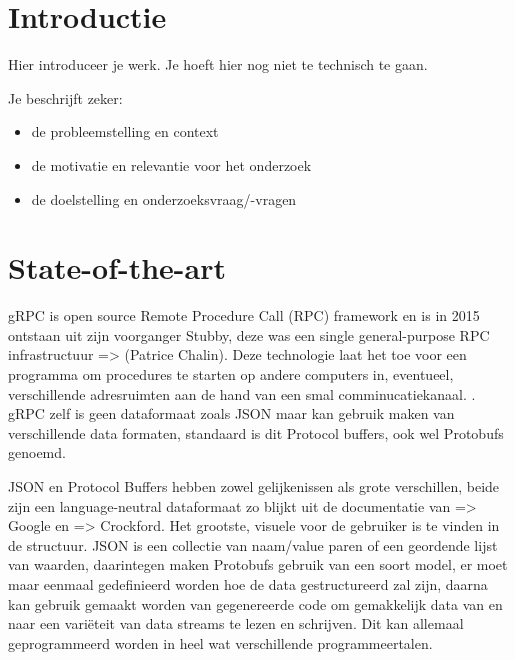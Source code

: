 
\section{Introductie} %
\label{sec:introductie}

Hier introduceer je werk. Je hoeft hier nog niet te technisch te gaan.

Je beschrijft zeker:

\begin{itemize}
  \item de probleemstelling en context
  \item de motivatie en relevantie voor het onderzoek
  \item de doelstelling en onderzoeksvraag/-vragen
\end{itemize}


\section{State-of-the-art}
\label{sec:state-of-the-art}
gRPC is open source Remote Procedure Call (RPC) framework en is in 2015 ontstaan uit zijn voorganger Stubby, deze was een single general-purpose RPC infrastructuur \autocite{Chalin} => (Patrice Chalin). Deze technologie laat het toe voor een programma om procedures te starten op andere computers in, eventueel, verschillende adresruimten aan de hand van een smal comminucatiekanaal. \autocite{Nelson1981}. gRPC zelf is geen dataformaat zoals JSON maar kan gebruik maken van verschillende data formaten, standaard is dit Protocol buffers, ook wel Protobufs genoemd.

JSON en Protocol Buffers hebben zowel gelijkenissen als grote verschillen, beide zijn een language-neutral dataformaat zo blijkt uit de documentatie van \autocite{Google} => Google en \autocite{Crockford} => Crockford. Het grootste, visuele voor de gebruiker is te vinden in de structuur. JSON is een collectie van naam/value paren of een geordende lijst van waarden, daarintegen maken Protobufs gebruik van een soort model, er moet maar eenmaal gedefinieerd worden hoe de data gestructureerd zal zijn, daarna kan gebruik gemaakt worden van gegenereerde code om gemakkelijk data van en naar een variëteit van data streams te lezen en schrijven. Dit kan allemaal geprogrammeerd worden in heel wat verschillende programmeertalen.

